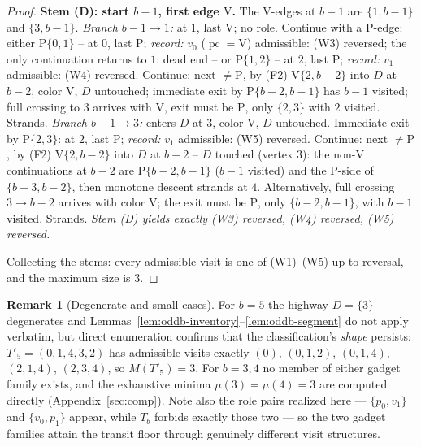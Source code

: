 \documentclass[11pt]{article}
\theoremstyle{definition}
\newtheorem{remark}[theorem]{Remark}
\DeclareMathOperator{\pc}{pc}
\begin{document}
\begin{proof}
\smallskip
\noindent\textbf{Stem (D): start $b-1$, first edge $\mathrm V$.} The V-edges at $b-1$
are $\{1,b-1\}$ and $\{3,b-1\}$.
\emph{Branch $b-1 \to 1$:} at $1$, last $\mathrm V$; no role. Continue with a P-edge:
either $\mathrm P\{0,1\}$ -- at $0$, last $\mathrm P$; \emph{record:} $v_0$
($\pc = \mathrm V$) admissible: (W3) reversed; the only continuation returns to $1$:
dead end -- or $\mathrm P\{1,2\}$ -- at $2$, last $\mathrm P$; \emph{record:} $v_1$
admissible: (W4) reversed. Continue: next $\ne \mathrm P$, by (F2)
$\mathrm V\{2,b-2\}$ into $D$ at $b-2$, color $\mathrm V$, $D$ untouched; immediate
exit by $\mathrm P\{b-2,b-1\}$ has $b-1$ visited; full crossing to $3$ arrives with
$\mathrm V$, exit must be $\mathrm P$, only $\{2,3\}$ with $2$ visited. Strands.
\emph{Branch $b-1 \to 3$:} enters $D$ at $3$, color $\mathrm V$, $D$ untouched.
Immediate exit by $\mathrm P\{2,3\}$: at $2$, last $\mathrm P$; \emph{record:} $v_1$
admissible: (W5) reversed. Continue: next $\ne \mathrm P$, by (F2)
$\mathrm V\{2,b-2\}$ into $D$ at $b-2$ -- $D$ touched (vertex $3$): the
non-$\mathrm V$ continuations at $b-2$ are $\mathrm P\{b-2,b-1\}$ ($b-1$ visited) and
the P-side of $\{b-3,b-2\}$, then monotone descent strands at $4$. Alternatively,
full crossing $3 \to b-2$ arrives with color $\mathrm V$; the exit must be
$\mathrm P$, only $\{b-2,b-1\}$, with $b-1$ visited. Strands.
\emph{Stem (D) yields exactly (W3) reversed, (W4) reversed, (W5) reversed.}

\smallskip
Collecting the stems: every admissible visit is one of (W1)--(W5) up to reversal, and
the maximum size is $3$.
\end{proof}

\begin{remark}[Degenerate and small cases]\label{rem:oddb-small}
For $b = 5$ the highway $D = \{3\}$ degenerates and
Lemmas~\ref{lem:oddb-inventory}--\ref{lem:oddb-segment} do not apply verbatim, but
direct enumeration confirms that the classification's \emph{shape} persists:
$T'_5 = (0,1,4,3,2)$ has admissible visits exactly $(0)$, $(0,1,2)$, $(0,1,4)$,
$(2,1,4)$, $(2,3,4)$, so $M(T'_5) = 3$. For $b = 3, 4$ no member of either gadget
family exists, and the exhaustive minima $\mu(3) = \mu(4) = 3$ are computed directly
(Appendix~\ref{sec:comp}). Note also the role pairs realized here ---
$\{p_0, v_1\}$ and $\{v_0, p_1\}$ appear, while $T_b$ forbids exactly those two ---
so the two gadget families attain the transit floor through genuinely different visit
structures.
\end{remark}
\end{document}

